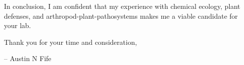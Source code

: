 \documentclass[11pt]{letter} %
\begin{document}
\begin{letter}
In conclusion, I am confident that my experience with chemical ecology, plant defenses, and arthropod-plant-pathosystems makes me a viable candidate for your lab.

Thank you for your time and consideration,

\quad -- Austin N Fife

\thispagestyle{empty}

\end{letter}
\end{document}
